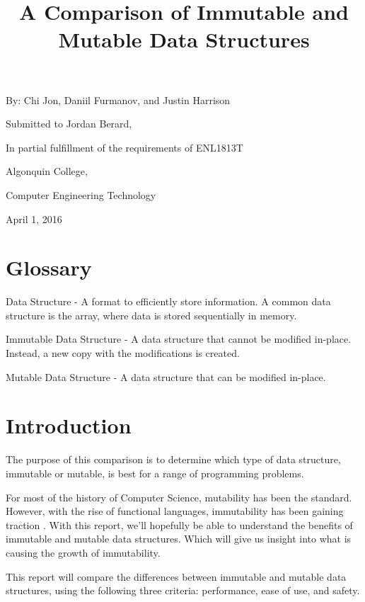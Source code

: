 \documentclass[11pt]{article}
\title{A Comparison of Immutable and Mutable Data Structures}
\author{}
\date{}
\newcommand{\glossaryentry}[2]{#1 - #2}
\begin{document}
\maketitle

\begin{center}
By:  Chi Jon, Daniil Furmanov, and Justin Harrison

\hfill

Submitted to Jordan Berard,

In partial fulfillment of the requirements of ENL1813T

\hfill

Algonquin College,

Computer Engineering Technology

\hfill

April 1, 2016

\clearpage
\end{center}

\section*{Glossary}
\glossaryentry{Data Structure}{
  A format to efficiently store information. A common data
  structure is the array, where data is stored sequentially in memory.
}

\glossaryentry{Immutable Data Structure}{
  A data structure that cannot be modified in-place.
  Instead, a new copy with the modifications is created.
}

\glossaryentry{Mutable Data Structure}{
  A data structure that can be modified in-place.
}
\clearpage

\section*{Introduction}
The purpose of this comparison is to determine which type of data structure,
immutable or mutable, is best for a range of programming problems.

For most of the history of Computer Science, mutability has been the standard.
However, with the rise of functional languages, immutability has been gaining
traction \cite{ieee_spectrum}. With this report, we'll hopefully be able to
understand the benefits of immutable and mutable data structures. Which will
give us insight into what is causing the growth of immutability.

This report will compare the differences between immutable and mutable data
structures, using the following three criteria: performance, ease of use, and
safety.
\end{document}
